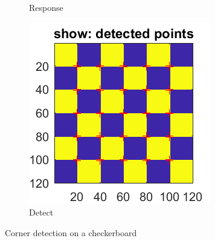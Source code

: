 \begin{figure}[htbp]
\begin{subfigure}[t]{0.3\textwidth}
		\caption{Response}\label{fig:5b}
	\end{subfigure}
	\begin{subfigure}[t]{0.3\textwidth}
	    \centering
		\includegraphics[width=\textwidth]{hw2/problem3/detect_checkerboard.png}
		\caption{Detect}\label{fig:5c}
	\end{subfigure}
	\caption{Corner detection on a checkerboard}\label{fig:5}
\end{figure}

